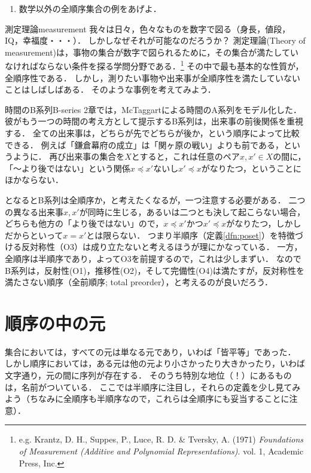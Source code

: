 \documentclass[dvipdfmx,11pt,a4paper]{jsarticle}
\begin{document}
\begin{renshu}{}{}
\begin{enumerate}
 \item 数学以外の全順序集合の例をあげよ．
\end{enumerate}
\end{renshu}


\begin{rei}{測定理論}{measurement}
我々は日々，色々なものを数字で図る（身長，値段，IQ，幸福度・・・）．
しかしなぜそれが可能なのだろうか？
測定理論(Theory of measurement)は，事物の集合が数字で図られるために，その集合が満たしていなければならない条件を探る学問分野である．\footnote{e.g. Krantz, D. H., Suppes, P., Luce, R. D. \& Tversky, A. (1971) \textit{Foundations of Measurement (Additive and Polynomial Representations)}. vol. 1, Academic Press, Inc.}
その中で最も基本的な性質が，全順序性である．
しかし，測りたい事物や出来事が全順序性を満たしていないことはしばしばある．
そのような事例を考えてみよう．
\end{rei}


\begin{rei}{時間のB系列}{B-series}
2章では，McTaggartによる時間のA系列をモデル化した．
彼がもう一つの時間の考え方として提示するB系列は，出来事の前後関係を重視する．
全ての出来事は，どちらが先でどちらが後か，という順序によって比較できる．
例えば「鎌倉幕府の成立」は「関ヶ原の戦い」よりも前である，というように．
再び出来事の集合を$X$とすると，これは任意のペア$x, x' \in X$の間に，「〜より後ではない」という関係$x \preceq x'$ないし$x' \preceq x$がなりたつ，ということにほかならない．

となるとB系列は全順序か，と考えたくなるが，一つ注意する必要がある．
二つの異なる出来事$x, x'$が同時に生じる，あるいは二つとも決して起こらない場合，どちらも他方の「より後ではない」ので，$x \preceq x'$かつ$x' \preceq x$がなりたつ，しかしだからといって$x = x'$とは限らない．
つまり半順序（定義\ref{dfn:poset}）を特徴づける反対称性（O3）は成り立たないと考えるほうが理にかなっている．
一方，全順序は半順序であり，よってO3を前提するので，これは少しまずい．
なのでB系列は，反射性(O1)，推移性(O2)，そして完備性(O4)は満たすが，反対称性を満たさない順序（全前順序; total preorder），と考えるのが良いだろう．
\end{rei}



\section{順序の中の元}
集合においては，すべての元は単なる元であり，いわば「皆平等」であった．
しかし順序においては，ある元は他の元より小さかったり大きかったり，いわば文字通り，元の間に序列が存在する．
そのうち特別な地位（！）にあるものは，名前がついている．
ここでは半順序に注目し，それらの定義を少し見てみよう（ちなみに全順序も半順序なので，これらは全順序にも妥当することに注意）．
\end{document}

